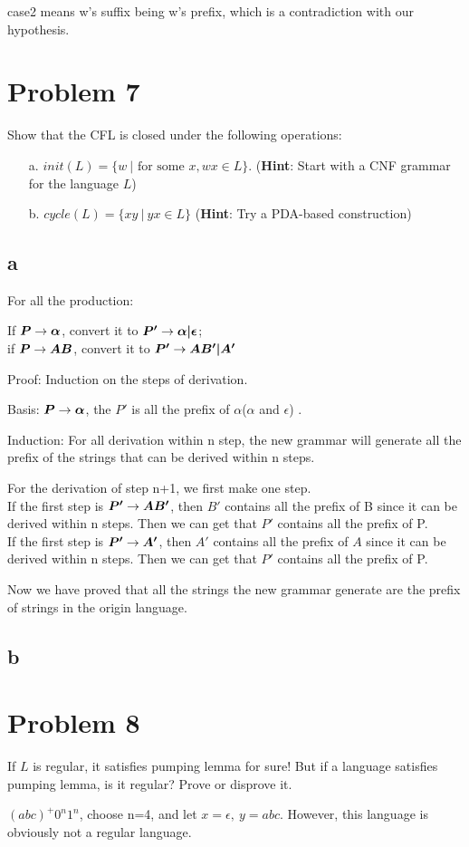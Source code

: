 \documentclass[a4paper,UTF8]{ctexart}
\theoremstyle{definition}
\begin{document}
case2 means w's suffix being w's prefix, which is a contradiction with our hypothesis.




\section*{Problem 7}
Show that the CFL is closed under the following operations:
\begin{enumerate}
	\item[a.] $init(L)=\{w\ |\mbox{ for some }x, wx \in L\}$. (\textbf{Hint}: Start with a CNF grammar for the language $L$)
	\item[b.] $cycle(L)=\{xy\ |\ yx \in L\}$ (\textbf{Hint}: Try a PDA-based construction)
\end{enumerate}

\subsection*{a}

For all the production: 

If $\boldsymbol{P} \rightarrow \boldsymbol{\alpha}$, convert it to $\boldsymbol{P'} \rightarrow \boldsymbol{\alpha|\epsilon}$;\\
if $\boldsymbol{P} \rightarrow \boldsymbol{AB}$, convert it to $\boldsymbol{P'} \rightarrow \boldsymbol{AB'|A'}$

Proof:
Induction on the steps of derivation. 

Basis: $\boldsymbol{P} \rightarrow \boldsymbol{\alpha}$, the $P'$ is all the prefix of $\alpha$($\alpha$ and $\epsilon$) .

Induction:
	For all derivation within n step, the new grammar will generate all the prefix
	of the strings that can be derived within n steps. 

	For the derivation of step n+1, we first make one step.\\
	If the first step is $\boldsymbol{P'} \rightarrow \boldsymbol{AB'}$, then $B'$ contains all the prefix of B since it
	can be derived within n steps. Then we can get that $P'$ contains all the 
	prefix of P.\\
	If the first step is $\boldsymbol{P'} \rightarrow \boldsymbol{A'}$, then $A'$ contains all the prefix of 
	$A$ since it can be derived within n steps. Then we can get that $P'$ contains all
	the prefix of P.

	Now we have proved that all the strings the new grammar generate are the prefix of strings 
	in the origin language.

\subsection*{b}


\section*{Problem 8}
If $L$ is regular, it satisfies pumping lemma for sure! But if a language satisfies pumping lemma, is it regular? Prove or disprove it.

$(abc)^+0^n1^n$, choose n=4, and let $x=\epsilon,\ y=abc$. However, this language is obviously not 
a regular language.
\end{document}
